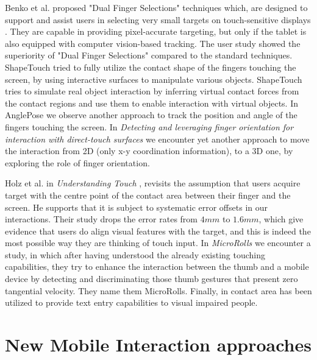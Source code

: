 Benko et al. proposed "Dual Finger Selections" techniques which, are designed to support and assist users in selecting very small targets on touch-sensitive displays \cite{Benko:2006:PST:1124772.1124963}. They are capable in providing pixel-accurate targeting, but only if the tablet is also equipped with computer vision-based tracking. The user study showed the superiority of "Dual Finger Selections" compared to the standard techniques. 
ShapeTouch \cite{CaoShapeTouch} tried to fully utilize the contact shape of the fingers touching the screen, by using interactive surfaces to manipulate various objects. ShapeTouch tries to simulate real object interaction by inferring virtual contact forces from the contact regions and use them to enable interaction with virtual objects. In AnglePose \cite{Rogers:2011:ARP:1978942.1979318} we observe another approach to track the position and angle of the fingers touching the screen.
In \emph{Detecting and leveraging finger orientation for interaction with direct-touch surfaces} \cite{Wang:2009:DLF:1622176.1622182} we encounter yet another approach to move the interaction from 2D (only x-y coordination information), to a 3D one, by exploring the role of finger orientation.

Holz et al. in \emph{Understanding Touch} \cite{Holz:2011:UT:1978942.1979308}, revisits the assumption that users acquire target with the centre point of the contact area between their finger and the screen. He supports that it is subject to systematic error offsets in our interactions. Their study drops the error rates from $4mm$ to $1.6mm$, which give evidence that users do align visual features with the target, and this is indeed the most possible way they are thinking of touch input.
 In \emph{MicroRolls} \cite{Roudaut:2009:MET:1518701.1518843} we encounter a study, in which after having understood the already existing touching capabilities, they try to enhance the interaction between the thumb and a mobile device by detecting and discriminating those thumb gestures that present zero tangential velocity. They name them MicroRolls. 
 Finally, in \cite{Goh:2014:ETE:2658779.2658780} contact area has been utilized to provide text entry capabilities to visual impaired people.





\section{New Mobile Interaction approaches}

